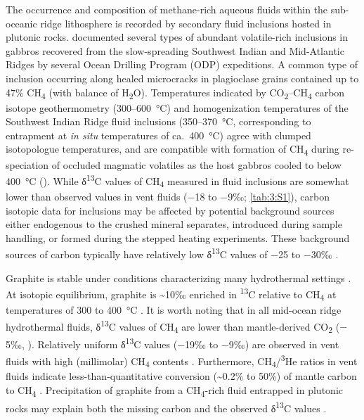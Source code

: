 The occurrence and composition of methane-rich aqueous fluids within the
sub-oceanic ridge lithosphere is recorded by secondary fluid inclusions
hosted in plutonic rocks. \textcite{Kelley_1996_JGR,Kelley_1997,Kelley+FruhGreen_1999_JGR} documented several types of abundant volatile-rich inclusions in
gabbros recovered from the slow-spreading Southwest Indian and
Mid-Atlantic Ridges by several Ocean Drilling Program (ODP) expeditions.
A common type of inclusion occurring along healed microcracks in
plagioclase grains contained up to 47\% CH\textsubscript{4} (with
balance of H\textsubscript{2}O). Temperatures indicated by
CO\textsubscript{2}--CH\textsubscript{4} carbon isotope geothermometry
(300--600~°C) and homogenization temperatures of the Southwest Indian
Ridge fluid inclusions (350--370~°C, corresponding to entrapment at
\emph{in situ} temperatures of ca.\ 400~°C) \parencite{Kelley+FruhGreen_1999_JGR}
agree with clumped isotopologue temperatures, and are compatible with
formation of CH\textsubscript{4} during re-speciation of occluded
magmatic volatiles as the host gabbros cooled to below 400~°C ().
While δ\textsuperscript{13}C values of CH\textsubscript{4} measured in
fluid inclusions are somewhat lower \parencite[$-$34 to $-$20‰;][]{Kelley+FruhGreen_1999_JGR} than observed values in vent fluids ($-$18 to $-$9‰; \autoref{tab:3:S1}), carbon isotopic data for inclusions may be affected by
potential background sources either endogenous to the crushed mineral
separates, introduced during sample handling, or formed during the
stepped heating experiments. These background sources of carbon typically
have relatively low δ\textsuperscript{13}C values of $-$25 to $-$30‰ \parencite{DesMarais_1986_EPSL,Miller+Pillinger_1997_GCA}.

Graphite is stable under conditions characterizing many hydrothermal
settings \parencite{Luque++_2009_G,Rumble_2014_E}. At isotopic equilibrium,
graphite is \textasciitilde{}10‰ enriched in \textsuperscript{13}C relative to
CH\textsubscript{4} at temperatures of 300 to 400~°C \parencite{Bottinga_1969_GCA}.
It is worth noting that in all mid-ocean ridge hydrothermal fluids,
δ\textsuperscript{13}C values of CH\textsubscript{4} are lower than
mantle-derived CO\textsubscript{2} ($-$5‰, ). Relatively uniform
δ\textsuperscript{13}C values ($-$19‰ to $-$9‰) are observed in vent fluids
with high (millimolar) CH\textsubscript{4} contents \parencite{McCollom+Seewald_2007_CR,Keir_2010_GRL}. Furthermore,
CH\textsubscript{4}/\textsuperscript{3}He ratios in vent fluids \parencite[see][]{Keir_2010_GRL} indicate less-than-quantitative conversion
(\textasciitilde{}0.2\% to 50\%) of mantle carbon to CH\textsubscript{4}
 \parencite[C/\textsuperscript{3}He \textasciitilde{} 1×10\textsuperscript{9},][]{Marty+Tolstikhin_1998_CG}. Precipitation of graphite from a
CH\textsubscript{4}-rich fluid entrapped in plutonic rocks may explain
both the missing carbon \parencite{McDermott++_2015_PNAS} and the observed
δ\textsuperscript{13}C values \parencite{Luque++_2012_GFront}.

